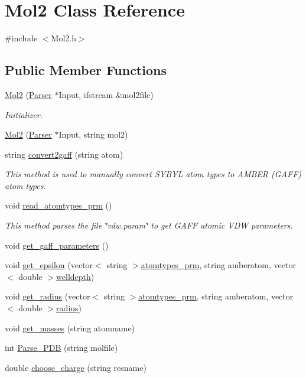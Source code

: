 \hypertarget{classMol2}{
\section{Mol2 Class Reference}
\label{classMol2}
}


{\ttfamily \#include $<$Mol2.h$>$}

\subsection*{Public Member Functions}
\begin{DoxyCompactItemize}
\item 
\hyperlink{classMol2_aff957509e1c8052cb7a33917ce102e28}{Mol2} (\hyperlink{classParser}{Parser} $\ast$Input, ifstream \&mol2file)
\begin{DoxyCompactList}\small\item\em Initializer. \end{DoxyCompactList}\item 
\hyperlink{classMol2_a3e897bf2a69edee09a3ceeb087e01798}{Mol2} (\hyperlink{classParser}{Parser} $\ast$Input, string mol2)
\item 
string \hyperlink{classMol2_af1016f0bda8dfee9c9793c854f251c12}{convert2gaff} (string atom)
\begin{DoxyCompactList}\small\item\em This method is used to manually convert SYBYL atom types to AMBER (GAFF) atom types. \end{DoxyCompactList}\item 
void \hyperlink{classMol2_aa45d86655d8da4b16f4b0c10973db532}{read\_\-atomtypes\_\-prm} ()
\begin{DoxyCompactList}\small\item\em This method parses the file \char`\"{}vdw.param\char`\"{} to get GAFF atomic VDW parameters. \end{DoxyCompactList}\item 
void \hyperlink{classMol2_a5e2851e35054c696d7c6337dc3bbff4a}{get\_\-gaff\_\-parameters} ()
\item 
void \hyperlink{classMol2_a67891cb3f97578ffaaa534e88365b4a9}{get\_\-epsilon} (vector$<$ string $>$\hyperlink{classMol2_a6bda0cb634fcad4bc779b68e15e4862a}{atomtypes\_\-prm}, string amberatom, vector$<$ double $>$\hyperlink{classMol2_aa6b07421f7462dbbb56fdae22b01dcd3}{welldepth})
\item 
void \hyperlink{classMol2_ae61015438b1bdad702acd9257c39a167}{get\_\-radius} (vector$<$ string $>$\hyperlink{classMol2_a6bda0cb634fcad4bc779b68e15e4862a}{atomtypes\_\-prm}, string amberatom, vector$<$ double $>$\hyperlink{classMol2_ae7574bc736a4fcf91d269806af6dac56}{radius})
\item 
void \hyperlink{classMol2_ab66223849c845f05b25b84b8a9aa6fb9}{get\_\-masses} (string atomname)
\item 
int \hyperlink{classMol2_a9af4d634599c86c4d5b8c5617c6b282c}{Parse\_\-PDB} (string molfile)
\item 
double \hyperlink{classMol2_a19f5f8645105f9395c4ca8455b7bde25}{choose\_\-charge} (string resname)
\end{DoxyCompactItemize}
